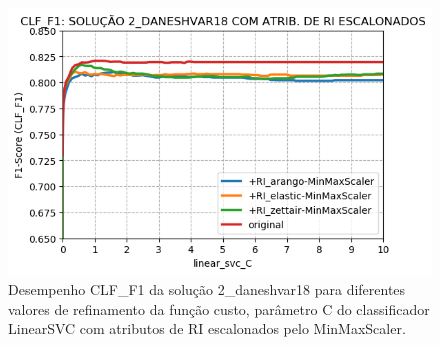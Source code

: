 \begin{figure}[h]
    \centering
    \caption{Desempenho CLF\_F1 da solução 2\_daneshvar18 para diferentes valores de refinamento da função custo, parâmetro C do classificador LinearSVC com atributos de RI escalonados pelo MinMaxScaler.}
    \vspace{-0.0cm}
    \begin{center}
        \includegraphics[width=1.0\textwidth]{img/clf-f1-2-daneshvar18-ir-scaled.png}
    \end{center}
    \vspace{-0.0cm}
    \label{fig:clf-f1-2-daneshvar18-ir-scaled}
\end{figure}